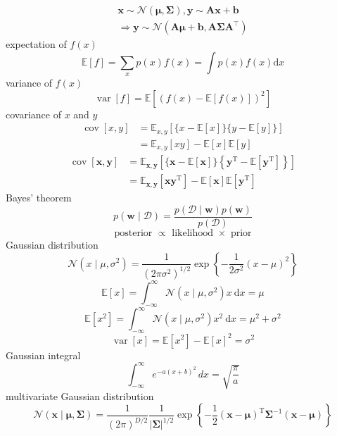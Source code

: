 \documentclass{article}
\begin{document}
	$$
	\begin{array}{l}
	\mathbf{x} \sim \mathcal{N}(\boldsymbol{\mu}, \boldsymbol{\Sigma}), \mathbf{y} \sim \mathbf{A x}+\mathbf{b} \\
	\Rightarrow \mathbf{y} \sim \mathcal{N}\left(\mathbf{A} \boldsymbol{\mu}+\mathbf{b}, \mathbf{A} \boldsymbol{\Sigma} \mathbf{A}^{\top}\right)
	\end{array}
	$$	
	expectation of $f(x)$
	$$
	\mathbb{E}[f]=\sum_{x} p(x) f(x)=\int p(x) f(x) \mathrm{d} x
	$$
	variance of $f(x)$
	$$
	\operatorname{var}[f]=\mathbb{E}\left[(f(x)-\mathbb{E}[f(x)])^{2}\right]
	$$
	covariance of $x$ and $y$
	$$
	\begin{aligned}
	\operatorname{cov}[x, y] &=\mathbb{E}_{x, y}[\{x-\mathbb{E}[x]\}\{y-\mathbb{E}[y]\}] \\
	&=\mathbb{E}_{x, y}[x y]-\mathbb{E}[x] \mathbb{E}[y]
	\end{aligned}
	$$
	$$
	\begin{aligned}
	\operatorname{cov}[\mathbf{x}, \mathbf{y}] &=\mathbb{E}_{\mathbf{x}, \mathbf{y}}\left[\{\mathbf{x}-\mathbb{E}[\mathbf{x}]\}\left\{\mathbf{y}^{\mathrm{T}}-\mathbb{E}\left[\mathbf{y}^{\mathrm{T}}\right]\right\}\right] \\
	&=\mathbb{E}_{\mathbf{x}, \mathbf{y}}\left[\mathbf{x} \mathbf{y}^{\mathrm{T}}\right]-\mathbb{E}[\mathbf{x}] \mathbb{E}\left[\mathbf{y}^{\mathrm{T}}\right]
	\end{aligned}
	$$
	Bayes’ theorem
	$$
	p(\mathbf{w} \mid \mathcal{D})=\frac{p(\mathcal{D} \mid \mathbf{w}) p(\mathbf{w})}{p(\mathcal{D})}
	$$
	$$
	\text { posterior } \propto \text { likelihood } \times \text { prior }
	$$
	Gaussian distribution
	$$
	\mathcal{N}\left(x \mid \mu, \sigma^{2}\right)=\frac{1}{\left(2 \pi \sigma^{2}\right)^{1 / 2}} \exp \left\{-\frac{1}{2 \sigma^{2}}(x-\mu)^{2}\right\}
	$$
	$$
	\mathbb{E}[x]=\int_{-\infty}^{\infty} \mathcal{N}\left(x \mid \mu, \sigma^{2}\right) x \mathrm{~d} x=\mu
	$$
	$$
	\mathbb{E}\left[x^{2}\right]=\int_{-\infty}^{\infty} \mathcal{N}\left(x \mid \mu, \sigma^{2}\right) x^{2} \mathrm{~d} x=\mu^{2}+\sigma^{2}
	$$
	$$
	\operatorname{var}[x]=\mathbb{E}\left[x^{2}\right]-\mathbb{E}[x]^{2}=\sigma^{2}
	$$
	Gaussian integral
	$$
	{\displaystyle \int _{-\infty }^{\infty }e^{-a(x+b)^{2}}\,dx={\sqrt {\frac {\pi }{a}}}}
	$$
	multivariate Gaussian distribution
	$$
	\mathcal{N}(\mathbf{x} \mid \boldsymbol{\mu}, \boldsymbol{\Sigma})=\frac{1}{(2 \pi)^{D / 2}} \frac{1}{|\boldsymbol{\Sigma}|^{1 / 2}} \exp \left\{-\frac{1}{2}(\mathbf{x}-\boldsymbol{\mu})^{\mathrm{T}} \boldsymbol{\Sigma}^{-1}(\mathbf{x}-\boldsymbol{\mu})\right\}
	$$
\end{document}
